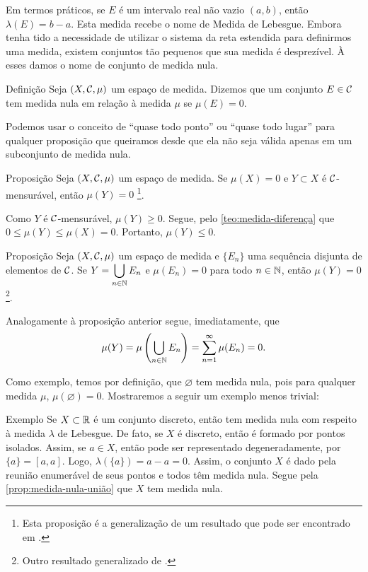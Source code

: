 Em termos práticos, se $E$ é um intervalo real não vazio $(a,b)$, então $\lambda(E) = b - a$.
Esta medida recebe o nome de Medida de Lebesgue. 
Embora tenha tido a necessidade de utilizar o sistema da reta estendida para definirmos uma medida, existem conjuntos tão pequenos que sua medida é desprezível.
À esses damos o nome de conjunto de medida nula.
\begin{env}{Definição}
	\label{def:conjunto-medida-nula}
	Seja $(X, \operatorname{\mathcal{C}}, \mu)$ um espaço de medida.
	Dizemos que um conjunto $E \in \operatorname{\mathcal{C}}$ tem medida nula em relação à medida $\mu$ se $\mu(E) = 0$.
\end{env}

Podemos usar o conceito de \enquote{quase todo ponto} ou \enquote{quase todo lugar} para qualquer proposição que queiramos desde que ela não seja válida apenas em um subconjunto de medida nula.
\begin{env}{Proposição}
	\label{prop:medida-nula-subconjunto}
	Seja $(X, \operatorname{\mathcal{C}}, \mu)$ um espaço de medida.
	Se $\mu(X) = 0$ e $Y \subset X$ é $\operatorname{\mathcal{C}}$-mensurável, então $\mu(Y) = 0$ \footnote{
		Esta proposição é a generalização de um resultado que pode ser encontrado em \cite[p.343]{elon}.
		}.
\end{env}
\begin{prova}
	Como $Y$ é $\operatorname{\mathcal{C}}$-mensurável, $\mu(Y)\geq 0$.
	Segue, pelo \ref{teo:medida-diferença} que
	$
	0 \leq \mu(Y) \leq \mu(X) = 0
	$.
	Portanto, $\mu(Y) \leq 0$.
	\vspace{-0.4cm}
\end{prova}

\begin{env}{Proposição}
	\label{prop:medida-nula-união}
	Seja $(X, \operatorname{\mathcal{C}}, \mu)$ um espaço de medida e $\{E_n\}$ uma sequência disjunta de elementos de $\operatorname{\mathcal{C}}$.
	Se $Y = \displaystyle\bigcup_{n \in \operatorname{\mathbb{N}}}E_n$ e $\mu(E_n) = 0$ para todo $n \in \operatorname{\mathbb{N}}$, então $\mu(Y) = 0$
	\footnote{
		Outro resultado generalizado de \cite[p.343]{elon}.
		}.
\end{env}
\begin{prova}
	Analogamente à proposição anterior segue, imediatamente, que
	$$
	\mu(Y)
	=
	\mu\left(\bigcup_{n \in \operatorname{\mathbb{N}}}E_n\right)
	=
	\sum_{n = 1}^\infty \mu(E_n)
	= 0.
	$$
\end{prova}

Como exemplo, temos por definição, que $\varnothing$ tem medida nula, pois para qualquer medida $\mu$, $\mu(\varnothing) = 0$.
Mostraremos a seguir um exemplo menos trivial:

\begin{env}{Exemplo}
	Se $X \subset \mathbb{R}$ é um conjunto discreto, então tem medida nula com respeito à medida $\lambda$ de Lebesgue.
	De fato, se $X$ é discreto, então é formado por pontos isolados.
	Assim, se $a \in X$, então pode ser representado degeneradamente, por 
	$\{a\} = [a,a]$.
	Logo, $\lambda(\{a\}) = a - a = 0$.
	Assim, o conjunto $X$ é dado pela reunião enumerável de seus pontos e todos têm medida nula. 
	Segue pela \ref{prop:medida-nula-união} que $X$ tem medida nula.
\end{env}


 

